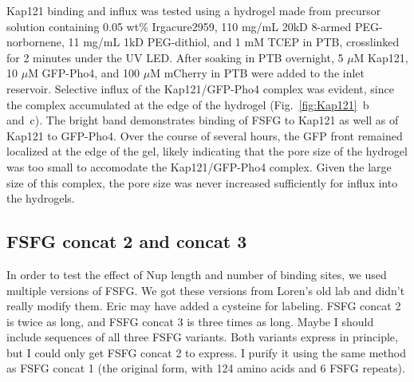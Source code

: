 Kap121 binding and influx was tested using a hydrogel made from precursor solution containing 0.05 wt\% Irgacure2959, 110 mg/mL 20kD 8-armed PEG-norbornene, 11 mg/mL 1kD PEG-dithiol, and 1 mM TCEP in PTB, crosslinked for 2 minutes under the UV LED.  After soaking in PTB overnight, 5 $\mu$M Kap121, 10 $\mu$M GFP-Pho4, and 100 $\mu$M mCherry in PTB were added to the inlet reservoir.  Selective influx of the Kap121/GFP-Pho4 complex was evident, since the complex accumulated at the edge of the hydrogel (Fig.~\ref{fig:Kap121}~b and~c).  The bright band demonstrates binding of FSFG to Kap121 as well as of Kap121 to GFP-Pho4.  Over the course of several hours, the GFP front remained localized at the edge of the gel, likely indicating that the pore size of the hydrogel was too small to accomodate the Kap121/GFP-Pho4 complex.  Given the large size of this complex, the pore size was never increased sufficiently for influx into the hydrogels.


\subsection{FSFG concat 2 and concat 3}
In order to test the effect of Nup length and number of binding sites, we used multiple versions of FSFG.  We got these versions from Loren's old lab and didn't really modify them.  Eric may have added a cysteine for labeling.  FSFG concat 2 is twice as long, and FSFG concat 3 is three times as long.  Maybe I should include sequences of all three FSFG variants.  Both variants express in principle, but I could only get FSFG concat 2 to express.  I purify it using the same method as FSFG concat 1 (the original form, with 124 amino acids and 6 FSFG repeats).  

